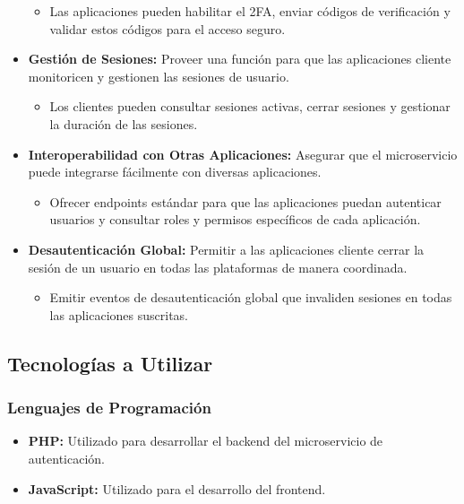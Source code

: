 \documentclass{article}
\begin{document}
\begin{itemize}
          \begin{itemize}
              \item Las aplicaciones pueden habilitar el 2FA, enviar códigos de verificación y validar estos códigos para el acceso seguro.
          \end{itemize}
    \item \textbf{Gestión de Sesiones:} Proveer una función para que las aplicaciones cliente monitoricen y gestionen las sesiones de usuario.
          \begin{itemize}
              \item Los clientes pueden consultar sesiones activas, cerrar sesiones y gestionar la duración de las sesiones.
          \end{itemize}
    \item \textbf{Interoperabilidad con Otras Aplicaciones:} Asegurar que el microservicio puede integrarse fácilmente con diversas aplicaciones.
          \begin{itemize}
              \item Ofrecer endpoints estándar para que las aplicaciones puedan autenticar usuarios y consultar roles y permisos específicos de cada aplicación.
          \end{itemize}
    \item \textbf{Desautenticación Global:} Permitir a las aplicaciones cliente cerrar la sesión de un usuario en todas las plataformas de manera coordinada.
          \begin{itemize}
              \item Emitir eventos de desautenticación global que invaliden sesiones en todas las aplicaciones suscritas.
          \end{itemize}
\end{itemize}

\subsection{Tecnologías a Utilizar}

\subsubsection{Lenguajes de Programación}
\begin{itemize}
    \item \textbf{PHP:} Utilizado para desarrollar el backend del microservicio de autenticación.
    \item \textbf{JavaScript:} Utilizado para el desarrollo del frontend.
\end{itemize}
\end{document}
